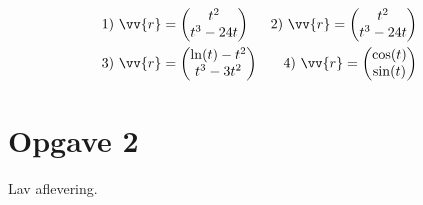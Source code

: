 \begin{align*}
	&1) \  
	\vv{r} =
	\begin{pmatrix}
		t^2 \\
		t^3-24t
	\end{pmatrix}	
	   &2) \ 
	   \vv{r} =
	\begin{pmatrix}
		t^2 \\
		t^3-24t
	\end{pmatrix}    \\
		&3) \  
	\vv{r} =
	\begin{pmatrix}
		\ln(t)-t^2 \\
		t^3-3t^2
	\end{pmatrix}	
	   &4) \ 
	   \vv{r} =
	\begin{pmatrix}
		\cos(t) \\
		\sin(t)
	\end{pmatrix}    \\
\end{align*}

\section*{Opgave 2}

Lav aflevering.